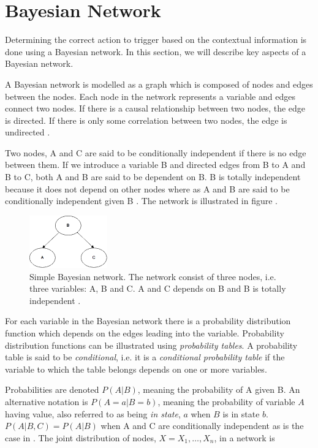 \section{Bayesian Network}

Determining the correct action to trigger based on the contextual information is done using a Bayesian network. In this section, we will describe key aspects of a Bayesian network.

A Bayesian network is modelled as a graph which is composed of nodes and edges between the nodes. Each node in the network represents a variable and edges connect two nodes. If there is a causal relationship between two nodes, the edge is directed. If there is only some correlation between two nodes, the edge is undirected \cite{stephenson2000introduction}.

Two nodes, A and C are said to be conditionally independent if there is no edge between them. If we introduce a variable B and directed edges from B to A and B to C, both A and B are said to be dependent on B. B is totally independent because it does not depend on other nodes where as A and B are said to be conditionally independent given B \cite{stephenson2000introduction}. The network is illustrated in figure .

\begin{figure}[h!]
\centering
\includegraphics[width=0.3\textwidth]{images/a_b_c_bayesian_network}
\caption{Simple Bayesian network. The network consist of three nodes, i.e. three variables: A, B and C. A and C depends on B and B is totally independent \cite{stephenson2000introduction}.}
\label{fig:analysis:bayesian-network:abc}
\end{figure}

For each variable in the Bayesian network there is a probability distribution function which depends on the edges leading into the variable. Probability distribution functions can be illustrated using \emph{probability tables}. A probability table is said to be \emph{conditional}, i.e. it is a \emph{conditional probability table} if the variable to which the table belongs depends on one or more variables.

Probabilities are denoted $P(A|B)$, meaning the probability of A given B. An alternative notation is $P(A=a|B=b)$, meaning the probability of variable $A$ having value, also referred to as being \emph{in state}, $a$ when $B$ is in state $b$. $P(A|B,C) = P(A|B)$ when A and C are conditionally independent as is the case in . The joint distribution of nodes, $X = X_1,\ldots,X_n$, in a network is 

